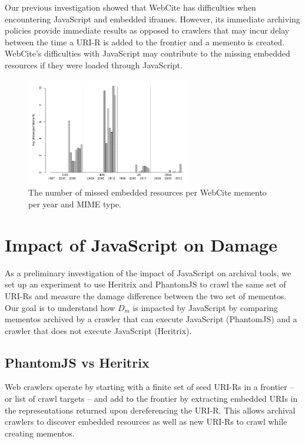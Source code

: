 Our previous investigation \cite{ijdl} showed that WebCite has difficulties when encountering JavaScript and embedded iframes. However, its immediate archiving policies provide immediate results as opposed to crawlers that may incur delay between the time a URI-R is added to the frontier and a memento is created. WebCite's difficulties with JavaScript may contribute to the missing embedded resources if they were loaded through JavaScript.


\begin{figure}[h!]
\includegraphics[width=270px]{./imgs/FileTypes_webcite.png}
\caption{The number of missed embedded resources per WebCite memento per year and MIME type.
}
\label{occstatsWC}
\end{figure}


\section{Impact of JavaScript on Damage}
\label{wcjs}


As a preliminary investigation of the impact of JavaScript on archival tools, we set up an experiment to use Heritrix and PhantomJS \cite{pjs} to crawl the same set of URI-Rs and measure the damage difference between the two set of mementos. Our goal is to understand how $D_m$ is impacted by JavaScript by comparing mementos archived by a crawler that can execute JavaScript (PhantomJS) and a crawler that does not execute JavaScript (Heritrix).

\subsection{PhantomJS vs Heritrix}
\label{pjsvhtrix}
Web crawlers operate by starting with a finite set of seed URI-Rs in a frontier -- or list of crawl targets -- and add to the frontier by extracting embedded URIs in the representations returned upon dereferencing the URI-R. This allows archival crawlers to discover embedded resources as well as new URI-Rs to crawl while creating mementos. 

